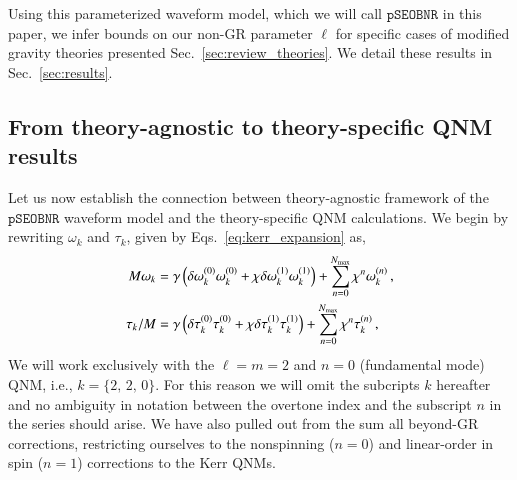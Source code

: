 \documentclass[twocolumn,
               prd,
               aps,
               superscriptaddress,
               tightenlines,
               nofootinbib,
               eqsecnum,
               amsfonts,
               amsmath,
               longbibliography]{revtex4-1}
\newcommand{\pSEOB}{\texttt{pSEOBNR}}
\newcommand{\hs}[1]{{\textcolor{blue}{{[HS: #1]}} }}
\begin{document}
Using this parameterized waveform model, which we will call $\pSEOB$ in this
paper, we infer bounds on our non-GR parameter $\ell$ for specific cases of
modified gravity theories presented Sec.~\ref{sec:review_theories}.
%
We detail these results in Sec.~\ref{sec:results}.
%
%
%



\subsection{From theory-agnostic to theory-specific QNM results}
\label{sec:theory_specific_qnm}

Let us now establish the connection between theory-agnostic framework of the
$\pSEOB$ waveform model and the theory-specific QNM calculations.
%
We begin by rewriting $\omega_{k}$ and $\tau_{k}$, given by Eqs.~\eqref{eq:kerr_expansion} as,
%
\begin{subequations}
\label{eq:qnm_nongr_iso}
\begin{align}
    M \omega_{k} &= \gamma \left( \delta\omega^{(0)}_{k} \omega^{(0)}_{k} + \chi \delta\omega^{(1)}_{k} \omega^{(1)}_{k} \right)
    + \sum_{n=0}^{N_{\rm max}} \chi^{n} \omega^{(n)}_{k} \,,
\\
    \tau_{k}/M   &= \gamma \left( \delta\tau^{(0)}_{k} \tau^{(0)}_{k} + \chi \delta\tau^{(1)}_{k} \tau^{(1)}_{k} \right)
    + \sum_{n=0}^{N_{\rm max}} \chi^{n} \tau^{(n)}_{k}\,,
\end{align}
\end{subequations}
%
We will work exclusively with the $\ell = m = 2$ and $n = 0$ (fundamental mode)
QNM, i.e., $k = \{2,\, 2,\, 0\}$. For this reason we will omit the subcripts
$k$ hereafter and no ambiguity in notation between the overtone index and the
subscript $n$ in the series should arise.
%
We have also pulled out from the sum all beyond-GR corrections, restricting
ourselves to the nonspinning ($n=0$) and linear-order in spin ($n=1$)
corrections to the Kerr QNMs.
%
\end{document}
